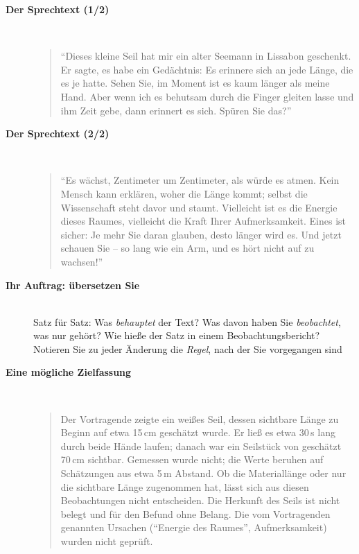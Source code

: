 \begin{description}
\item[{\rot\bf Der Sprechtext (1/2)}]~\\[-\lblskip]
\begin{quote}\nsl{\small}
\enquote{Dieses kleine Seil hat mir ein alter Seemann in Lissabon
geschenkt. Er sagte, es habe ein Gedächtnis: Es erinnere sich an jede
Länge, die es je hatte. Sehen Sie, im Moment ist es kaum länger als meine
Hand. Aber wenn ich es behutsam durch die Finger gleiten lasse und ihm Zeit
gebe, dann erinnert es sich. Spüren Sie das?}
\end{quote}
\os{\newpage}

\item[{\rot\bf Der Sprechtext (2/2)}]~\\[-\lblskip]
\begin{quote}\nsl{\small}
\enquote{Es wächst, Zentimeter um Zentimeter, als würde es atmen. Kein
Mensch kann erklären, woher die Länge kommt; selbst die Wissenschaft steht
davor und staunt. Vielleicht ist es die Energie dieses Raumes, vielleicht
die Kraft Ihrer Aufmerksamkeit. Eines ist sicher: Je mehr Sie daran
glauben, desto länger wird es. Und jetzt schauen Sie -- so lang wie ein
Arm, und es hört nicht auf zu wachsen!}
\end{quote}
\os{\newpage}

\item[{\rot\bf Ihr Auftrag: übersetzen Sie}]~\\[-\lblskip]
\bi
  \ite Satz für Satz: Was \emph{behauptet} der Text?
  \ite Was davon haben Sie \emph{beobachtet}, was nur gehört?
  \ite Wie hieße der Satz in einem Beobachtungsbericht?
  \ite Notieren Sie zu jeder Änderung die \emph{Regel}, nach der Sie
    vorgegangen sind
\ei
\os{\newpage}
\end{description}

\begin{description}
\item[{\rot\bf Eine mögliche Zielfassung}]~\\[-\lblskip]
\begin{quote}\nsl{\small}
Der Vortragende zeigte ein weißes Seil, dessen sichtbare Länge zu Beginn
auf etwa 15\,cm geschätzt wurde. Er ließ es etwa 30\,s lang durch beide
Hände laufen; danach war ein Seilstück von geschätzt 70\,cm sichtbar.
Gemessen wurde nicht; die Werte beruhen auf Schätzungen aus etwa 5\,m
Abstand. Ob die Materiallänge oder nur die sichtbare Länge zugenommen hat,
lässt sich aus diesen Beobachtungen nicht entscheiden. Die Herkunft des
Seils ist nicht belegt und für den Befund ohne Belang. Die vom Vortragenden
genannten Ursachen (\enquote{Energie des Raumes}, Aufmerksamkeit) wurden
nicht geprüft.
\end{quote}
\os{\newpage}
\end{description}

